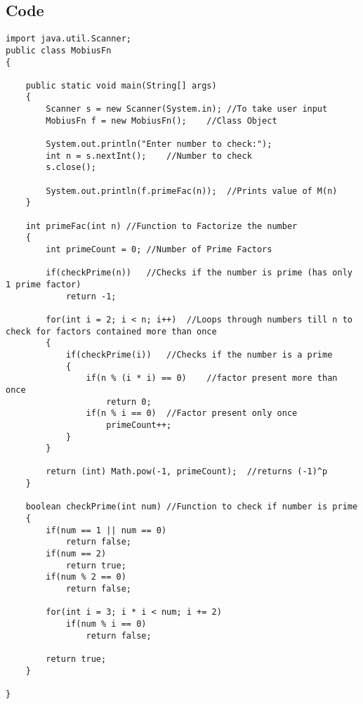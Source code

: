 \documentclass[ProgramminAssignment.tex]{subfiles}
\begin{document}
\subsection{Code}
\begin{lstlisting}
import java.util.Scanner;
public class MobiusFn
{

	public static void main(String[] args)
	{
		Scanner s = new Scanner(System.in);	//To take user input
		MobiusFn f = new MobiusFn();	//Class Object
		
		System.out.println("Enter number to check:");
		int n = s.nextInt();	//Number to check
		s.close();
		
		System.out.println(f.primeFac(n));	//Prints value of M(n)
	}
	
	int primeFac(int n)	//Function to Factorize the number
	{
		int primeCount = 0;	//Number of Prime Factors
		
		if(checkPrime(n))	//Checks if the number is prime (has only 1 prime factor)
			return -1;
		
		for(int i = 2; i < n; i++)	//Loops through numbers till n to check for factors contained more than once
		{	
			if(checkPrime(i))	//Checks if the number is a prime
			{
				if(n % (i * i) == 0)	//factor present more than once
					return 0;
				if(n % i == 0)	//Factor present only once
					primeCount++;
			}	
		}
		
		return (int) Math.pow(-1, primeCount);	//returns (-1)^p
	}
	
	boolean checkPrime(int num)	//Function to check if number is prime
	{
		if(num == 1 || num == 0)
			return false;
		if(num == 2)
			return true;
		if(num % 2 == 0)
			return false;
		
		for(int i = 3; i * i < num; i += 2)
			if(num % i == 0)
				return false;
		
		return true;
	}

}

\end{lstlisting}
\end{document}
